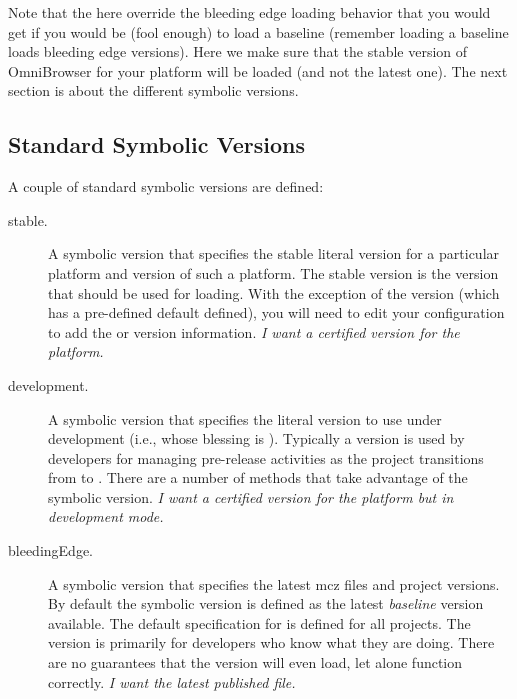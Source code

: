 \documentclass[a4paper,10pt,twoside]{book}
\begin{document}
Note that the  here override the bleeding edge loading behavior that you would get if you would be (fool enough) to load a baseline (remember loading a baseline loads bleeding edge versions). Here we make sure that the stable version of OmniBrowser for your platform will be loaded (and not the latest one). The next section is about the different symbolic versions.
    
   
    


\subsection{Standard Symbolic Versions}

A couple of standard symbolic versions are defined:

\begin{description}
\item [stable.] A symbolic version that specifies the stable literal version for a particular platform and version of such a platform. The stable version is the version that should be used for loading. With the exception of the  version (which has a pre-defined default defined), you will need to edit your configuration to add the  or  version information. \emph{I want a certified version for the platform.}

\item [development.] A symbolic version that specifies the literal version to use under development (i.e., whose blessing is ). Typically a  version is used by developers for managing pre-release activities as the project transitions from  to . There are a number of  methods that take advantage of the  symbolic version. \emph{I want a certified version for the platform but in development mode.}



\item [bleedingEdge.]  A symbolic version that specifies the latest mcz files and project versions. By default the  symbolic version is defined as the latest \emph{baseline} version available. The default specification for  is defined for all projects. The  version is primarily for developers who know what they are doing. There are no guarantees that the  version will even load, let alone function correctly. \emph{I want the latest published file.}

\end{description}
\end{document}
